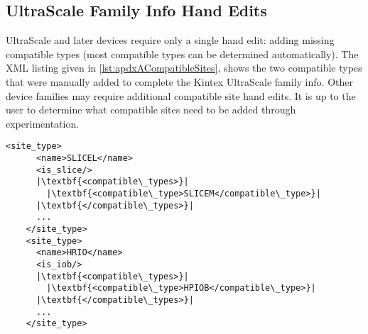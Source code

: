 \subsection{UltraScale Family Info Hand Edits} \label{sec:ultrascaleHandEdits}

UltraScale and later devices require only a single hand edit: adding 
missing compatible types (most compatible types can be determined
automatically). The XML listing given in \autoref{lst:apdxACompatibleSites},
shows the two compatible types that were manually added to complete the Kintex
UltraScale family info. Other device families may require additional compatible
site hand edits. It is up to the user to determine what compatible sites need
to be added through experimentation.

\begin{lstlisting}[numbers=none, caption=Manually added compatible sites for
UltraScale devices, label=lst:apdxACompatibleSites] 
    <site_type>
      <name>SLICEL</name>
      <is_slice/>
      |\textbf{<compatible\_types>}|
        |\textbf{<compatible\_type>SLICEM</compatible\_type>}|
      |\textbf{</compatible\_types>}|
      ...
    </site_type>
    <site_type>
      <name>HRIO</name> 
      <is_iob/>
      |\textbf{<compatible\_types>}|
        |\textbf{<compatible\_type>HPIOB</compatible\_type>}|
      |\textbf{</compatible\_types>}|
      ...
    </site_type>
\end{lstlisting}  
